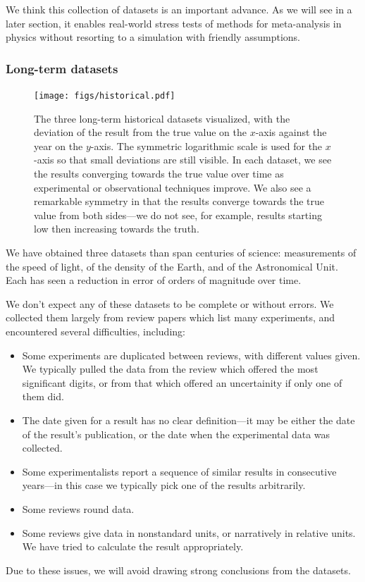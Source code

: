 \documentclass[12pt]{article}
\begin{document}
We think this collection of datasets is an important advance. As we will see in a later section, it enables real-world stress tests of methods for meta-analysis in physics without resorting to a simulation with friendly assumptions.

\subsubsection{Long-term datasets}

\begin{figure}
  \texttt{[image: figs/historical.pdf]}
  \caption{The three long-term historical datasets visualized, with the deviation of the result from the true value on the $x$-axis against the year on the $y$-axis. The symmetric logarithmic scale is used for the $x$-axis so that small deviations are still visible. In each dataset, we see the results converging towards the true value over time as experimental or observational techniques improve. We also see a remarkable symmetry in that the results converge towards the true value from both sides---we do not see, for example, results starting low then increasing towards the truth.}
  \label{fig:historical}
\end{figure}

We have obtained three datasets than span centuries of science: measurements of the speed of light, of the density of the Earth, and of the Astronomical Unit. Each has seen a reduction in error of orders of magnitude over time.

We don't expect any of these datasets to be complete or without errors. We collected them largely from review papers which list many experiments, and encountered several difficulties, including:
\begin{itemize}
  \item Some experiments are duplicated between reviews, with different values given. We typically pulled the data from the review which offered the most significant digits, or from that which offered an uncertainity if only one of them did.
  \item The date given for a result has no clear definition---it may be either the date of the result's publication, or the date when the experimental data was collected.
  \item Some experimentalists report a sequence of similar results in consecutive years---in this case we typically pick one of the results arbitrarily.
  \item Some reviews round data.
  \item Some reviews give data in nonstandard units, or narratively in relative units. We have tried to calculate the result appropriately.
\end{itemize}
Due to these issues, we will avoid drawing strong conclusions from the datasets.
\end{document}
